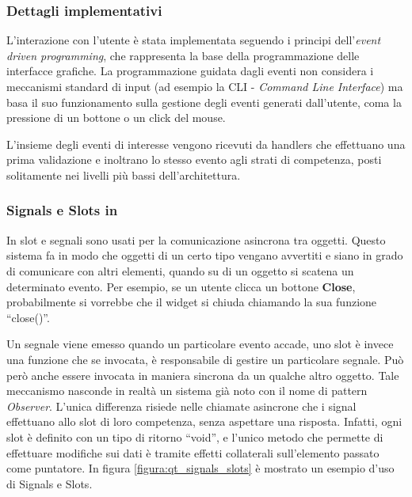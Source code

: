 \subsubsection*{Dettagli implementativi}
L'interazione con l'utente è stata implementata seguendo i principi dell'\emph{event driven programming}, che rappresenta la base della programmazione delle interfacce grafiche. La programmazione guidata dagli eventi non considera i meccanismi standard di input (ad esempio la CLI - \emph{Command Line Interface}) ma basa il suo funzionamento sulla gestione degli eventi generati dall'utente, coma la pressione di un bottone o un click del mouse. 

L'insieme degli eventi di interesse vengono ricevuti da handlers che effettuano una prima validazione e inoltrano lo stesso evento agli strati di competenza, posti solitamente nei livelli più bassi dell'architettura.

\subsubsection*{Signals e Slots in \qt{}}
In \qt{} slot e segnali sono usati per la comunicazione asincrona tra oggetti.
Questo sistema fa in modo che oggetti di un certo tipo vengano avvertiti e siano in grado di comunicare con altri elementi, quando su di un oggetto si scatena un determinato evento. Per esempio, se un utente clicca un bottone \textbf{Close}, probabilmente si vorrebbe che il widget si chiuda chiamando la sua funzione ``close()''.

Un segnale viene emesso quando un particolare evento accade, uno slot è invece una funzione che se invocata, è responsabile di gestire un particolare segnale. Può però anche essere invocata in maniera sincrona da un qualche altro oggetto.
Tale meccanismo nasconde in realtà un sistema già noto con il nome di pattern \textit{Observer}. L'unica differenza risiede nelle chiamate asincrone che i signal effettuano allo slot di loro competenza, senza aspettare una risposta. Infatti, ogni slot è definito con un tipo di ritorno ``void'', e l'unico metodo che permette di effettuare modifiche sui dati è tramite effetti collaterali sull'elemento passato come puntatore. In figura \ref{figura:qt_signals_slots} è mostrato un esempio d'uso di Signals e Slots.

